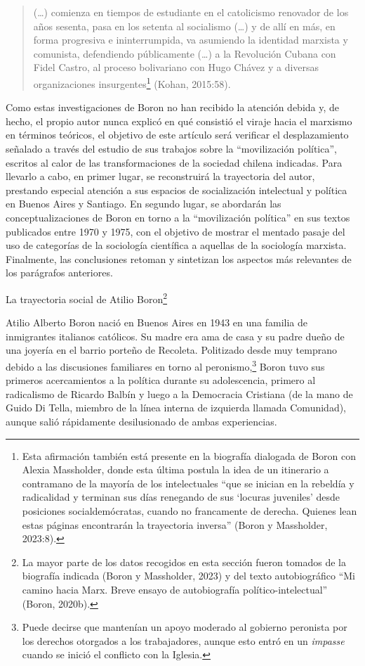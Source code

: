 \begin{quote}
(\ldots) comienza en tiempos de estudiante en el catolicismo renovador de los años sesenta, pasa en los setenta al socialismo (\ldots) y de allí en más, en forma progresiva e ininterrumpida, va asumiendo la identidad marxista y comunista, defendiendo públicamente (\ldots) a la Revolución Cubana con Fidel Castro, al proceso bolivariano con Hugo Chávez y a diversas organizaciones insurgentes\footnote{Esta afirmación también está presente en la biografía dialogada de Boron con Alexia Massholder, donde esta última postula la idea de un itinerario a contramano de la mayoría de los intelectuales ``que se inician en la rebeldía y radicalidad y terminan sus días renegando de sus `locuras juveniles' desde posiciones socialdemócratas, cuando no francamente de derecha. Quienes lean estas páginas encontrarán la trayectoria inversa'' (Boron y Massholder, 2023:8).} (Kohan, 2015:58).
\end{quote}

Como estas investigaciones de Boron no han recibido la atención debida y, de hecho, el propio autor nunca explicó en qué consistió el viraje hacia el marxismo en términos teóricos, el objetivo de este artículo será verificar el desplazamiento señalado a través del estudio de sus trabajos sobre la ``movilización política'', escritos al calor de las transformaciones de la sociedad chilena indicadas. Para llevarlo a cabo, en primer lugar, se reconstruirá la trayectoria del autor, prestando especial atención a sus espacios de socialización intelectual y política en Buenos Aires y Santiago. En segundo lugar, se abordarán las conceptualizaciones de Boron en torno a la ``movilización política'' en sus textos publicados entre 1970 y 1975, con el objetivo de mostrar el mentado pasaje del uso de categorías de la sociología científica a aquellas de la sociología marxista. Finalmente, las conclusiones retoman y sintetizan los aspectos más relevantes de los parágrafos anteriores.

La trayectoria social de Atilio Boron\footnote{La mayor parte de los datos recogidos en esta sección fueron tomados de la biografía indicada (Boron y Massholder, 2023) y del texto autobiográfico ``Mi camino hacia Marx. Breve ensayo de autobiografía político-intelectual'' (Boron, 2020b).}

Atilio Alberto Boron nació en Buenos Aires en 1943 en una familia de inmigrantes italianos católicos. Su madre era ama de casa y su padre dueño de una joyería en el barrio porteño de Recoleta. Politizado desde muy temprano debido a las discusiones familiares en torno al peronismo,\footnote{Puede decirse que mantenían un apoyo moderado al gobierno peronista por los derechos otorgados a los trabajadores, aunque esto entró en un \emph{impasse} cuando se inició el conflicto con la Iglesia.} Boron tuvo sus primeros acercamientos a la política durante su adolescencia, primero al radicalismo de Ricardo Balbín y luego a la Democracia Cristiana (de la mano de Guido Di Tella, miembro de la línea interna de izquierda llamada Comunidad), aunque salió rápidamente desilusionado de ambas experiencias.

